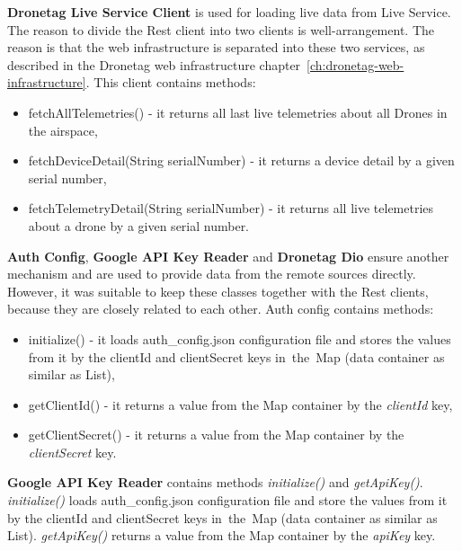 \textbf{Dronetag Live Service Client} is used for loading live data from Live Service.
The reason to divide the Rest client into two clients is well-arrangement.
The reason is that the web infrastructure is separated into these two services, as described in the Dronetag web infrastructure chapter~\ref{ch:dronetag-web-infrastructure}.
This client contains methods:
\begin{itemize}
    \item fetchAllTelemetries() - it returns all last live telemetries about all Drones in the airspace,
    \item fetchDeviceDetail(String serialNumber) - it returns a device detail by a given serial number,
    \item fetchTelemetryDetail(String serialNumber) - it returns all live telemetries about a drone by a given serial number.
\end{itemize}

\textbf{Auth Config}, \textbf{Google API Key Reader} and \textbf{Dronetag Dio} ensure another mechanism and are used to provide data from the remote sources directly.
However, it was suitable to keep these classes together with the Rest clients, because they are closely related to each other.
Auth config contains methods:
\begin{itemize}
    \item initialize() - it loads auth\_config.json configuration file and stores the values from it by the clientId and clientSecret keys in~the~Map (data container as similar as List),
    \item getClientId() - it returns a value from the Map container by the \textit{clientId} key,
    \item getClientSecret() - it returns a value from the Map container by the \textit{clientSecret} key.
\end{itemize}
\textbf{Google API Key Reader} contains methods \textit{initialize()} and \textit{getApiKey()}.
\textit{initialize()} loads auth\_config.json configuration file and store the values from it by the clientId and clientSecret keys in~the~Map (data container as similar as List).
\textit{getApiKey()} returns a value from the Map container by the \textit{apiKey} key.
